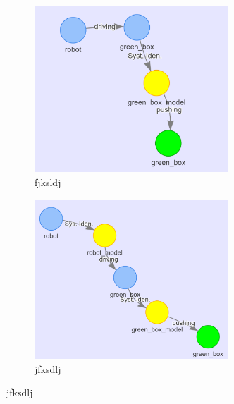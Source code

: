 \begin{figure}[H]
    \begin{subfigure}{.49\textwidth}
    \centering
    \includegraphics[width=0.8\textwidth]{figures/example_hyp_graph/4}
    \caption{fjksldj}%
    \end{subfigure}
    \hfill
    \begin{subfigure}{.49\textwidth}
    \centering
    \includegraphics[width=0.8\textwidth]{figures/example_hyp_graph/5}
    \caption{jfksdlj}%
    \end{subfigure}


\end{figure}
